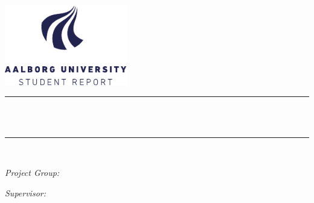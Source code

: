 \begin{titlepage}
\begin{center}
\newcommand{\HRule}{\rule{\linewidth}{0.5mm}}


\vspace*{\fill}

\includegraphics[width=0.4\textwidth]{Images/aauLogo.pdf}~\\[1cm]

\HRule \\[0.4cm]
{ \huge \bfseries \rapportnavn \\[0.4cm] }
\rapportsubtitle

\HRule \\[1.5cm]

\begin{minipage}{0.4\textwidth}
    \begin{flushleft} \large
        \emph{Project Group:}\\
        \textsc{\gruppen}
    \end{flushleft}
\end{minipage}
\begin{minipage}{0.4\textwidth}
    \begin{flushright} \large
        \emph{Supervisor:} \\
        \supervisor
    \end{flushright}
\end{minipage}


\vspace*{\fill}


\end{center}
\end{titlepage}

